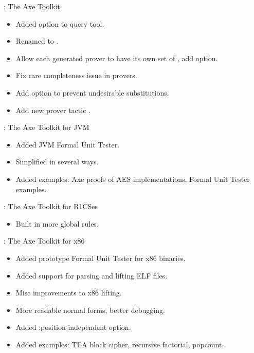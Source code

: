 \begin{frame}

\implibtitle

:
The Axe Toolkit
\begin{itemize}
\item Added  option to query tool.
\item Renamed  to .
\item Allow each generated prover to have its own set of , add  option.
\item Fix rare completeness issue in provers.
\item Add  option to prevent undesirable substitutions.
\item Add new prover tactic .
\end{itemize}

\end{frame}


\begin{frame}

\implibtitle

:
The Axe Toolkit for JVM
\begin{itemize}
\item Added JVM Formal Unit Tester.
\item Simplified  in several ways.
\item Added examples: Axe proofs of AES implementations, Formal Unit Tester examples.
\end{itemize}

:
The Axe Toolkit for R1CSes
\begin{itemize}
\item Built in more global rules.
\end{itemize}

\end{frame}


\begin{frame}

\implibtitle

:
The Axe Toolkit for x86
\begin{itemize}
\item Added prototype Formal Unit Tester for x86 binaries.
\item Added support for parsing and lifting ELF files.
\item Misc improvements to x86 lifting.
\item More readable normal forms, better debugging.
\item Added :position-independent option.
\item Added examples: TEA block cipher, recursive factorial, popcount.
\end{itemize}

\end{frame}

